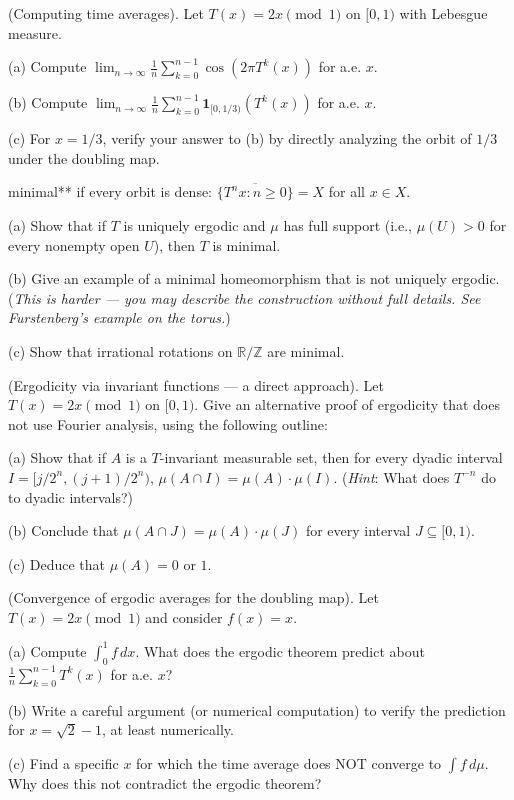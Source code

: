 \begin{exercise}
(Computing time averages). Let $T(x) = 2x \pmod{1}$ on $[0,1)$ with Lebesgue measure.

(a) Compute $\lim_{n \to \infty} \frac{1}{n}\sum_{k=0}^{n-1} \cos(2\pi T^k(x))$ for a.e. $x$.

(b) Compute $\lim_{n \to \infty} \frac{1}{n}\sum_{k=0}^{n-1} \mathbf{1}_{[0, 1/3)}(T^k(x))$ for a.e. $x$.

(c) For $x = 1/3$, verify your answer to (b) by directly analyzing the orbit of $1/3$ under the doubling map.
\end{exercise}


\begin{exercise}
minimal** if every orbit is dense: $\overline{\{T^n x : n \geq 0\}} = X$ for all $x \in X$.

(a) Show that if $T$ is uniquely ergodic and $\mu$ has full support (i.e., $\mu(U) > 0$ for every nonempty open $U$), then $T$ is minimal.

(b) Give an example of a minimal homeomorphism that is not uniquely ergodic. (\textit{This is harder --- you may describe the construction without full details. See Furstenberg's example on the torus.})

(c) Show that irrational rotations on $\mathbb{R}/\mathbb{Z}$ are minimal.
\end{exercise}


\begin{exercise}
(Ergodicity via invariant functions --- a direct approach). Let $T(x) = 2x \pmod{1}$ on $[0,1)$. Give an alternative proof of ergodicity that does not use Fourier analysis, using the following outline:

(a) Show that if $A$ is a $T$-invariant measurable set, then for every dyadic interval $I = [j/2^n, (j+1)/2^n)$, $\mu(A \cap I) = \mu(A) \cdot \mu(I)$. (\textit{Hint}: What does $T^{-n}$ do to dyadic intervals?)

(b) Conclude that $\mu(A \cap J) = \mu(A) \cdot \mu(J)$ for every interval $J \subseteq [0,1)$.

(c) Deduce that $\mu(A) = 0$ or $1$.
\end{exercise}


\begin{exercise}
(Convergence of ergodic averages for the doubling map). Let $T(x) = 2x \pmod 1$ and consider $f(x) = x$.

(a) Compute $\int_0^1 f \, dx$. What does the ergodic theorem predict about $\frac{1}{n}\sum_{k=0}^{n-1} T^k(x)$ for a.e. $x$?

(b) Write a careful argument (or numerical computation) to verify the prediction for $x = \sqrt{2} - 1$, at least numerically.

(c) Find a specific $x$ for which the time average does NOT converge to $\int f \, d\mu$. Why does this not contradict the ergodic theorem?
\end{exercise}


